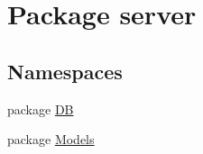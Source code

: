 \hypertarget{namespaceserver}{\section{Package server}
\label{namespaceserver}
}
\subsection*{Namespaces}
\begin{DoxyCompactItemize}
\item 
package \hyperlink{namespaceserver_1_1DB}{D\-B}
\item 
package \hyperlink{namespaceserver_1_1Models}{Models}
\end{DoxyCompactItemize}
